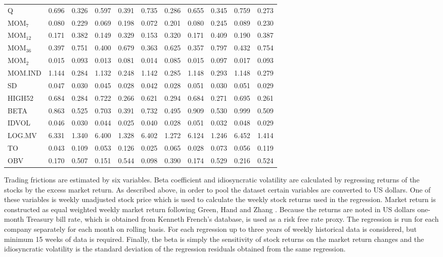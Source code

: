 \documentclass{article}
\begin{document}
\begin{table}[ht]
\begin{tabularx}{\textwidth}{@{\extracolsep{1pt}} X r r r r r r r r r r}
Q			& 0.696 	& 0.326	& 0.597 	& 0.391	& 0.735	& 0.286	& 0.655	& 0.345	& 0.759 	& 0.273 \\
MOM$_{7}$ 	& 0.080 	& 0.229	& 0.069 	& 0.198	& 0.072	& 0.201	& 0.080	& 0.245	& 0.089	& 0.230 \\
MOM$_{12}$ 	& 0.171	& 0.382	& 0.149 	& 0.329	& 0.153	& 0.320	& 0.171	& 0.409	& 0.190	& 0.387 \\
MOM$_{36}$ 	& 0.397	& 0.751	& 0.400 	& 0.679	& 0.363	& 0.625	& 0.357	& 0.797	& 0.432	& 0.754 \\
MOM$_{2}$ 	& 0.015 	& 0.093	& 0.013 	& 0.081	& 0.014	& 0.085	& 0.015	& 0.097	& 0.017	& 0.093 \\ 
MOM.IND 	& 1.144 	& 0.284	& 1.132 	& 0.248	& 1.142	& 0.285	& 1.148	& 0.293	& 1.148	& 0.279 \\
SD	 		& 0.047	& 0.030	& 0.045 	& 0.028	& 0.042	& 0.028	& 0.051	& 0.030	& 0.051	& 0.029 \\
HIGH52		& 0.684 	& 0.284	& 0.722 	& 0.266	& 0.621	& 0.294	& 0.684	& 0.271	& 0.695	& 0.261 \\
BETA	 	& 0.863 	& 0.525	& 0.703 	& 0.391	& 0.732	& 0.495	& 0.909	& 0.530	& 0.999	& 0.509 \\
IDVOL	 	& 0.046 	& 0.030	& 0.044 	& 0.025	& 0.040	& 0.028	& 0.051	& 0.032	& 0.048	& 0.029 \\ 
LOG.MV	 	& 6.331  	& 1.340	& 6.400 	& 1.328	& 6.402	& 1.272	& 6.124	& 1.246	& 6.452	& 1.414 \\ 
TO		 	& 0.043  	& 0.109	& 0.053 	& 0.126	& 0.025	& 0.065	& 0.028	& 0.073	& 0.056	& 0.119 \\
OBV		 	& 0.170 	& 0.507	& 0.151 	& 0.544	& 0.098	& 0.390	& 0.174	& 0.529	& 0.216	& 0.524 \\ 
\bottomrule
\end{tabularx}
\end{table} 

Trading frictions are estimated by six variables. Beta coefficient and idiosyncratic volatility are calculated by regressing returns of the stocks by the excess market return. As described above, in order to pool the dataset certain variables are converted to US dollars. One of these variables is weekly unadjusted stock price which is used to calculate the weekly stock returns used in the regression. Market return is constructed as equal weighted weekly market return following Green, Hand and Zhang \citeyear{Green2017}. Because the returns are noted in US dollars one-month Treasury bill rate, which is obtained from Kenneth French's database, is used as a risk free rate proxy. The regression is run for each company separately for each month on rolling basis. For each regression up to three years of weekly historical data is considered, but minimum 15 weeks of data is required. Finally, the beta is simply the sensitivity of stock returns on the market return changes and the idiosyncratic volatility is the standard deviation of the regression residuals obtained from the same regression. \par
\end{document}
